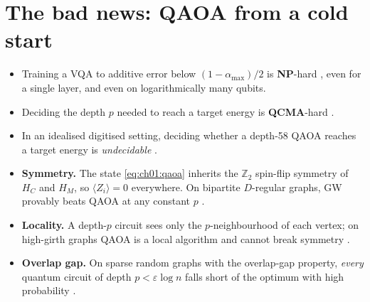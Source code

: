 \documentclass[overheadsbeamer.tex]{subfiles}
\begin{document}
\section{The bad news: QAOA from a cold start}

\begin{frame}
\begin{itemize}\setlength\itemsep{0.3em}
    \item Training a VQA to additive error below $(1-\alpha_{\max})/2$ is \textbf{NP}-hard \cite{bittel2021training}, even for a single layer, and even on logarithmically many qubits.
    \item Deciding the depth $p$ needed to reach a target energy is \textbf{QCMA}-hard \cite{bittelQCMA}.
    \item In an idealised digitised setting, deciding whether a depth-58 QAOA reaches a target energy is \emph{undecidable} \cite{korpas2025undecidable}.
\end{itemize}
\end{frame}

\begin{frame}
\begin{itemize}\setlength\itemsep{0.3em}
    \item \textbf{Symmetry.} The state \eqref{eq:ch01:qaoa} inherits the $\mathbb{Z}_2$ spin-flip symmetry of $H_C$ and $H_M$, so $\langle Z_i\rangle = 0$ everywhere. On bipartite $D$-regular graphs, GW provably beats QAOA at any constant $p$ \cite{Bravyi2020}.
    \item \textbf{Locality.} A depth-$p$ circuit sees only the $p$-neighbourhood of each vertex; on high-girth graphs QAOA is a local algorithm and cannot break symmetry \cite{BravyiKlieschKoenigTang2022,BarakMarwaha2022}.
    \item \textbf{Overlap gap.} On sparse random graphs with the overlap-gap property, \emph{every} quantum circuit of depth $p < \varepsilon \log n$ falls short of the optimum with high probability \cite{ChouLoveSandhuShi2021,ChenHuangMarwaha2023}.
\end{itemize}
\end{frame}
\end{document}
